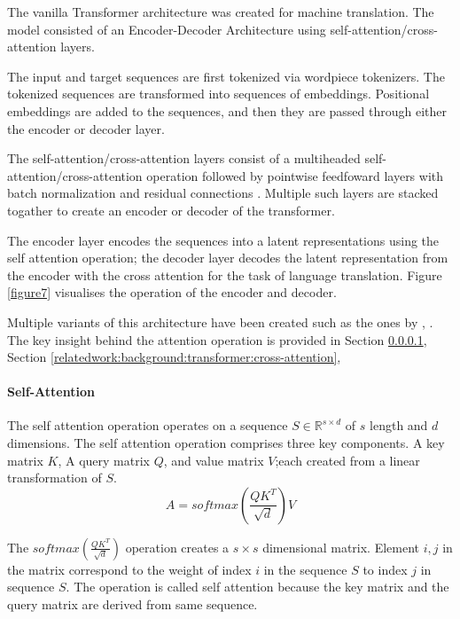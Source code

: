 The vanilla Transformer architecture \parencite{vaswani2017attention} was created for machine translation. The model consisted of an Encoder-Decoder Architecture using self-attention/cross-attention layers. 

The input and target sequences are first tokenized via wordpiece tokenizers. The tokenized sequences are transformed into sequences of embeddings. Positional embeddings are added to the sequences, and then they are passed through either the encoder or decoder layer.

The self-attention/cross-attention layers consist of a multiheaded self-attention/cross-attention operation followed by pointwise feedfoward layers with batch normalization \parencite{ioffe2015batch} and residual connections \parencite{he2016deep}. Multiple such layers are stacked togather to create an encoder or decoder of the transformer. 

The encoder layer encodes the sequences into a latent representations using the self attention operation; the decoder layer decodes the latent representation from the encoder with the cross attention for the task of language translation. Figure \ref{figure7} visualises the operation of the encoder and decoder. 

Multiple variants of this architecture have been created such as the ones by \cite{radford2019language}, \cite{devlin2018bert}. The key insight behind the attention operation is provided in Section \ref{relatedwork:background:transformer:attention}, Section \ref{relatedwork:background:transformer:cross-attention}, 

\paragraph{Self-Attention}
\label{relatedwork:background:transformer:attention}
The self attention operation operates on a sequence $S \in \mathbb{R}^{s \times d}$ of $s$ length and $d$ dimensions. The self attention operation comprises three key components. A key matrix $K$, A query matrix $Q$, and value matrix $V$;each created from a linear transformation of $S$. 
$$A = softmax(\frac{QK^T}{\sqrt{d}})V$$

The $softmax(\frac{QK^T}{\sqrt{d}})$ operation creates a $s \times s$ dimensional matrix. Element ${i,j}$ in the matrix correspond to the weight of index $i$ in the sequence $S$ to index $j$ in sequence $S$. The operation is called self attention because the key matrix and the query matrix are derived from same sequence.

